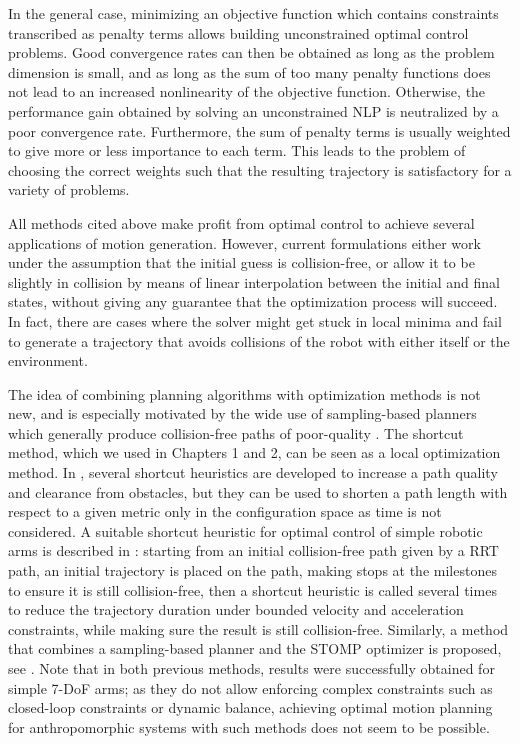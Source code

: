 In the general case, minimizing an objective function which contains
constraints transcribed as penalty terms allows building unconstrained
optimal control problems. Good convergence rates can then be obtained
as long as the problem dimension is small, and as long as the sum of
too many penalty functions does not lead to an increased nonlinearity
of the objective function. Otherwise, the performance gain obtained by
solving an unconstrained NLP is neutralized by a poor convergence
rate. Furthermore, the sum of penalty terms is usually weighted to
give more or less importance to each term. This leads to the problem
of choosing the correct weights such that the resulting trajectory is
satisfactory for a variety of problems.

\bigskip

All methods cited above make profit from optimal control to achieve
several applications of motion generation. However, current
formulations either work under the assumption that the initial guess
is collision-free, or allow it to be slightly in collision by means of
linear interpolation between the initial and final states, without
giving any guarantee that the optimization process will succeed. In
fact, there are cases where the solver might get stuck in local minima
and fail to generate a trajectory that avoids collisions of the robot
with either itself or the environment.

\bigskip

The idea of combining planning algorithms with optimization methods is
not new, and is especially motivated by the wide use of sampling-based
planners which generally produce collision-free paths of poor-quality
\cite{lava06}. The shortcut method, which we used in Chapters 1 and 2,
can be seen as a local optimization method. In
\cite{geraerts2007creating}, several shortcut heuristics are developed
to increase a path quality and clearance from obstacles, but they can
be used to shorten a path length with respect to a given metric only
in the configuration space as time is not considered. A suitable
shortcut heuristic for optimal control of simple robotic arms is
described in \cite{hauser2010fast}: starting from an initial
collision-free path given by a RRT path, an initial trajectory is
placed on the path, making stops at the milestones to ensure it is
still collision-free, then a shortcut heuristic is called several
times to reduce the trajectory duration under bounded velocity and
acceleration constraints, while making sure the result is still
collision-free. Similarly, a method that combines a sampling-based
planner and the \textsc{STOMP} optimizer is proposed, see
\cite{mainprice2012planification}. Note that in both previous methods,
results were successfully obtained for simple 7-DoF arms; as they do
not allow enforcing complex constraints such as closed-loop
constraints or dynamic balance, achieving optimal motion planning for
anthropomorphic systems with such methods does not seem to be possible.

